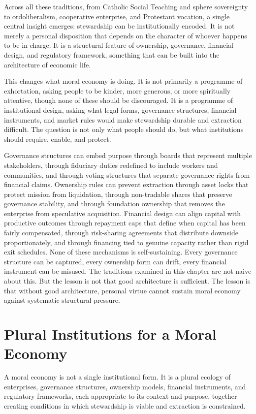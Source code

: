 \documentclass[11pt,a4paper,oneside]{book}
\begin{document}
Across all these traditions, from Catholic Social Teaching and sphere sovereignty to ordoliberalism, cooperative enterprise, and Protestant vocation, a single central insight emerges: stewardship can be institutionally encoded. It is not merely a personal disposition that depends on the character of whoever happens to be in charge. It is a structural feature of ownership, governance, financial design, and regulatory framework, something that can be built into the architecture of economic life.

This changes what moral economy is doing. It is not primarily a programme of exhortation, asking people to be kinder, more generous, or more spiritually attentive, though none of these should be discouraged. It is a programme of institutional design, asking what legal forms, governance structures, financial instruments, and market rules would make stewardship durable and extraction difficult. The question is not only what people should do, but what institutions should require, enable, and protect.

Governance structures can embed purpose through boards that represent multiple stakeholders, through fiduciary duties redefined to include workers and communities, and through voting structures that separate governance rights from financial claims. Ownership rules can prevent extraction through asset locks that protect mission from liquidation, through non-tradable shares that preserve governance stability, and through foundation ownership that removes the enterprise from speculative acquisition. Financial design can align capital with productive outcomes through repayment caps that define when capital has been fairly compensated, through risk-sharing agreements that distribute downside proportionately, and through financing tied to genuine capacity rather than rigid exit schedules. None of these mechanisms is self-sustaining. Every governance structure can be captured, every ownership form can drift, every financial instrument can be misused. The traditions examined in this chapter are not naive about this. But the lesson is not that good architecture is sufficient. The lesson is that without good architecture, personal virtue cannot sustain moral economy against systematic structural pressure.

\section*{Plural Institutions for a Moral Economy}

A moral economy is not a single institutional form. It is a plural ecology of enterprises, governance structures, ownership models, financial instruments, and regulatory frameworks, each appropriate to its context and purpose, together creating conditions in which stewardship is viable and extraction is constrained.
\end{document}
